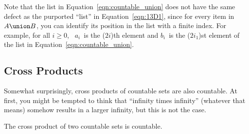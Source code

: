 Note that the list in Equation~\ref{eqn:countable_union} does not have
the same defect as the purported ``list'' in Equation~\ref{eqn:13D1},
since for every item in~$A \union B$, you can identify its position in
the list with a finite index.  For example, for all $i \ge 0$,
\ $a_i$~is the ($2i$)th element and $b_i$~is the ($2i_1$)st element of
the list in Equation~\ref{eqn:countable_union}.

\subsection{Cross Products}

Somewhat surprisingly, cross products of countable sets are also
countable.  At first, you might be tempted to think that ``infinity
times infinity'' (whatever that means) somehow results in a larger
infinity, but this is not the case.

\begin{theorem}\label{thm:countable_products}\label{thm:13D5}
The cross product of two countable sets is countable.
\end{theorem}

